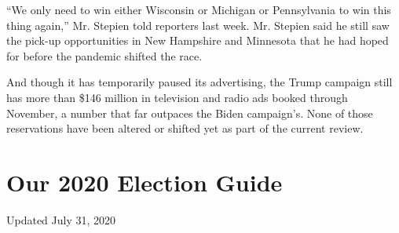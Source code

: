 ``We only need to win either Wisconsin or Michigan or Pennsylvania to
win this thing again,'' Mr. Stepien told reporters last week. Mr.
Stepien said he still saw the pick-up opportunities in New Hampshire and
Minnesota that he had hoped for before the pandemic shifted the race.

And though it has temporarily paused its advertising, the Trump campaign
still has more than \$146 million in television and radio ads booked
through November, a number that far outpaces the Biden campaign's. None
of those reservations have been altered or shifted yet as part of the
current review.

\hypertarget{our-2020-election-guide}{%
\section{Our 2020 Election Guide}\label{our-2020-election-guide}}

Updated July 31, 2020

